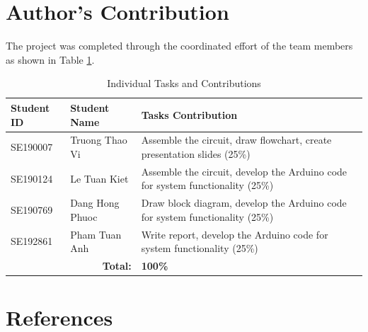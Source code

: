 \documentclass[a4paper, 10pt]{article}
\begin{document}
	\section{Author's Contribution}
	The project was completed through the coordinated effort of the team members as shown in Table \ref{tab:contribution}.
	
	\begin{table}[htbp]
		\centering
		\caption{Individual Tasks and Contributions}
		\begin{tabular}{@{}lll@{}}
			\toprule
			\textbf{Student ID} & \textbf{Student Name} & \textbf{Tasks Contribution} \\
			\midrule
			SE190007 & Truong Thao Vi & Assemble the circuit, draw flowchart, create presentation slides (25\%) \\
			SE190124 & Le Tuan Kiet & Assemble the circuit, develop the Arduino code for system functionality (25\%) \\
			SE190769 & Dang Hong Phuoc & Draw block diagram, develop the Arduino code for system functionality (25\%) \\
			SE192861 & Pham Tuan Anh & Write report, develop the Arduino code for system functionality (25\%) \\
			\bottomrule
			\multicolumn{2}{r}{\textbf{Total:}} & \textbf{100\%} \\
		\end{tabular}
		\label{tab:contribution}
	\end{table}
	
	
	\section*{References}
	

	
\end{document}
